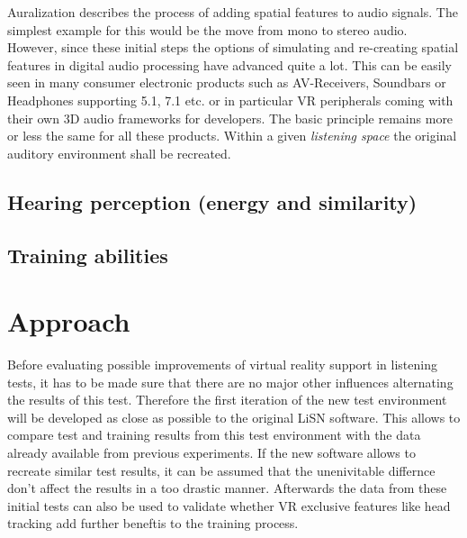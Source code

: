 \documentclass[a4paper,11pt]{article}%
\renewcommand{\\}{\vspace*{0.5\baselineskip} \newline}
\begin{document}
Auralization describes the process of adding spatial features to audio signals. The simplest example for this would be the move from mono to stereo audio. However, since these initial steps the options of simulating and re-creating spatial features in digital audio processing have advanced quite a lot. This can be easily seen in many consumer electronic products such as AV-Receivers, Soundbars or Headphones supporting 5.1, 7.1  etc. or in particular VR peripherals coming with their own 3D audio frameworks for developers.
\newline
\newline
The basic principle remains more or less the same for all these products. Within a given \textit{listening space} the original auditory environment shall be recreated.


\subsection{Hearing perception (energy and similarity)}



\subsection{Training abilities}




\section{Approach}
\label{sec:approach}



Before evaluating possible improvements of virtual reality support in listening tests, it has to be made sure that there are no major other influences alternating the results of this test. Therefore the first iteration of the new test environment will be developed as close as possible to the original LiSN software. This allows to compare test and training results from this test environment with the data already available from previous experiments. If the new software allows to recreate similar test results, it can be assumed that the unenivitable differnce don't affect the results in a too drastic manner. Afterwards the data from these initial tests can also be used to validate whether VR exclusive features like head tracking add further beneftis to the training process.
\newline
\newline
\end{document}
